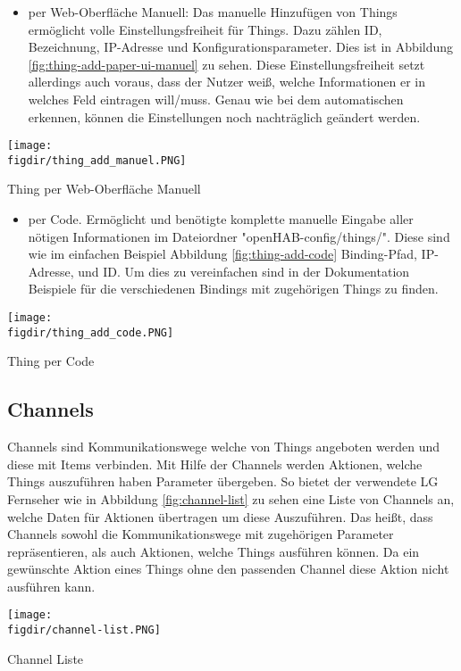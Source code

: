 \begin{itemize}	
	\item per Web-Oberfläche Manuell: Das manuelle Hinzufügen von Things ermöglicht volle Einstellungsfreiheit für Things. Dazu zählen ID, Bezeichnung, IP-Adresse und Konfigurationsparameter. Dies ist in Abbildung \ref{fig:thing-add-paper-ui-manuel} zu sehen. Diese Einstellungsfreiheit setzt allerdings auch voraus, dass der Nutzer weiß, welche Informationen er in welches Feld eintragen will/muss. Genau wie bei dem automatischen erkennen, können die Einstellungen noch nachträglich geändert werden. 
\end{itemize}
\centering
\captionsetup{type=figure}
\texttt{[image: \\figdir/thing\_add\_manuel.PNG]}
\caption{Thing per Web-Oberfläche Manuell \label{fig:thing-add-paper-ui-manuel}}

\begin{itemize}	
	\item per Code. Ermöglicht und benötigte komplette manuelle Eingabe aller nötigen Informationen im Dateiordner "openHAB-config/things/". Diese sind wie im einfachen Beispiel Abbildung \ref{fig:thing-add-code} Binding-Pfad, IP-Adresse, und ID. Um dies zu vereinfachen sind in der Dokumentation Beispiele für die verschiedenen Bindings mit zugehörigen Things zu finden.
\end{itemize}
\centering
\captionsetup{type=figure}
\texttt{[image: \\figdir/thing\_add\_code.PNG]}
\caption{Thing per Code \label{fig:thing-add-code}}

\subsection{Channels} \label{sec:channels}
Channels sind Kommunikationswege welche von Things angeboten werden und diese mit Items verbinden. Mit Hilfe der Channels werden Aktionen, welche Things auszuführen haben Parameter übergeben. So bietet der verwendete LG Fernseher wie in Abbildung \ref{fig:channel-list} zu sehen eine Liste von Channels an, welche Daten für Aktionen übertragen um diese Auszuführen. Das heißt, dass Channels sowohl die Kommunikationswege mit zugehörigen Parameter repräsentieren, als auch Aktionen, welche Things ausführen können. Da ein gewünschte Aktion eines Things ohne den passenden Channel diese Aktion nicht ausführen kann.

	\centering
	\captionsetup{type=figure}
	\texttt{[image: \\figdir/channel-list.PNG]}
	\caption{Channel Liste\label{fig:channel-list}}

